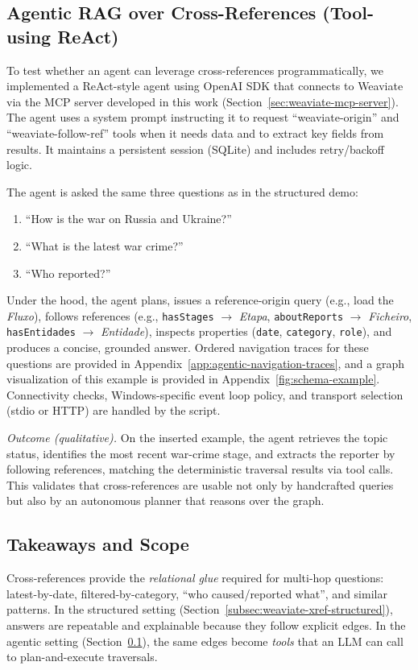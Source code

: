 \subsection{Agentic RAG over Cross-References (Tool-using ReAct)}
\label{subsec:agentic-xref}
To test whether an agent can leverage cross-references programmatically, we implemented a ReAct-style agent using OpenAI SDK that connects to Weaviate via the \gls{MCP} server developed in this work (Section~\ref{sec:weaviate-mcp-server}). The agent uses a system prompt instructing it to request \enquote{weaviate-origin} and \enquote{weaviate-follow-ref} tools when it needs data and to extract key fields from results. It maintains a persistent session (SQLite) and includes retry/backoff logic.

The agent is asked the same three questions as in the structured demo:
\begin{enumerate}
    \item \enquote{How is the war on Russia and Ukraine?}
    \item \enquote{What is the latest war crime?}
    \item \enquote{Who reported?}
\end{enumerate}
Under the hood, the agent plans, issues a reference-origin query (e.g., load the \textit{Fluxo}), follows references (e.g., \texttt{hasStages} \(\rightarrow\) \textit{Etapa}, \texttt{aboutReports} \(\rightarrow\) \textit{Ficheiro}, \texttt{hasEntidades} \(\rightarrow\) \textit{Entidade}), inspects properties (\texttt{date}, \texttt{category}, \texttt{role}), and produces a concise, grounded answer. Ordered navigation traces for these questions are provided in Appendix~\ref{app:agentic-navigation-traces}, and a graph visualization of this example is provided in Appendix~\ref{fig:schema-example}.
Connectivity checks, Windows-specific event loop policy, and transport selection (stdio or HTTP) are handled by the script.

\noindent\textit{Outcome (qualitative).} On the inserted example, the agent retrieves the topic status, identifies the most recent war-crime stage, and extracts the reporter by following references, matching the deterministic traversal results via tool calls. This validates that cross-references are usable not only by handcrafted queries but also by an autonomous planner that reasons over the graph.

\subsection{Takeaways and Scope}
Cross-references provide the \emph{relational glue} required for multi-hop questions: latest-by-date, filtered-by-category, \enquote{who caused/reported what}, and similar patterns. In the structured setting (Section~\ref{subsec:weaviate-xref-structured}), answers are repeatable and explainable because they follow explicit edges. In the agentic setting (Section~\ref{subsec:agentic-xref}), the same edges become \emph{tools} that an \gls{LLM} can call to plan-and-execute traversals. 

